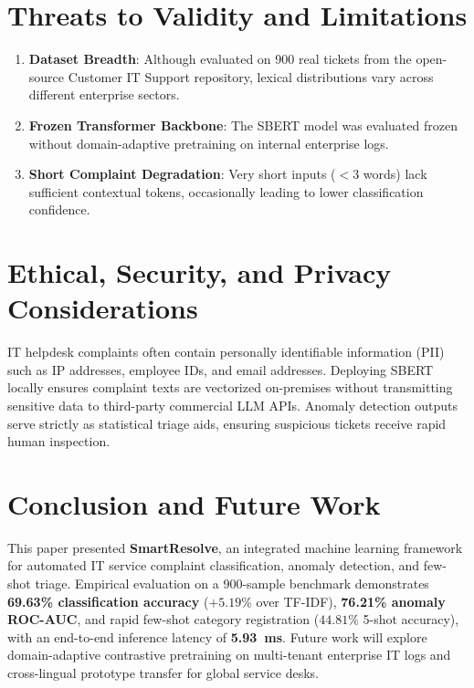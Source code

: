 \documentclass[conference]{IEEEtran}
\begin{document}
\section{Threats to Validity and Limitations}
\begin{enumerate}
    \item \textbf{Dataset Breadth}: Although evaluated on 900 real tickets from the open-source Customer IT Support repository, lexical distributions vary across different enterprise sectors.
    \item \textbf{Frozen Transformer Backbone}: The SBERT model was evaluated frozen without domain-adaptive pretraining on internal enterprise logs.
    \item \textbf{Short Complaint Degradation}: Very short inputs ($< 3$ words) lack sufficient contextual tokens, occasionally leading to lower classification confidence.
\end{enumerate}

\section{Ethical, Security, and Privacy Considerations}
IT helpdesk complaints often contain personally identifiable information (PII) such as IP addresses, employee IDs, and email addresses. Deploying SBERT locally ensures complaint texts are vectorized on-premises without transmitting sensitive data to third-party commercial LLM APIs. Anomaly detection outputs serve strictly as statistical triage aids, ensuring suspicious tickets receive rapid human inspection.

\section{Conclusion and Future Work}
This paper presented \textbf{SmartResolve}, an integrated machine learning framework for automated IT service complaint classification, anomaly detection, and few-shot triage. Empirical evaluation on a 900-sample benchmark demonstrates \textbf{69.63\% classification accuracy} ($+5.19\%$ over TF-IDF), \textbf{76.21\% anomaly ROC-AUC}, and rapid few-shot category registration ($44.81\%$ 5-shot accuracy), with an end-to-end inference latency of \textbf{5.93~ms}. Future work will explore domain-adaptive contrastive pretraining on multi-tenant enterprise IT logs and cross-lingual prototype transfer for global service desks.
\end{document}
